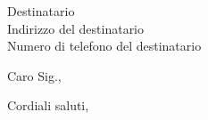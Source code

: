 \documentclass[a4paper,11pt]{letter}
\begin{document}
\begin{letter}{Destinatario\\Indirizzo del destinatario\\Numero di telefono del destinatario}

\opening{Caro Sig.,}


\closing{Cordiali saluti,}


\end{letter}
\end{document}
